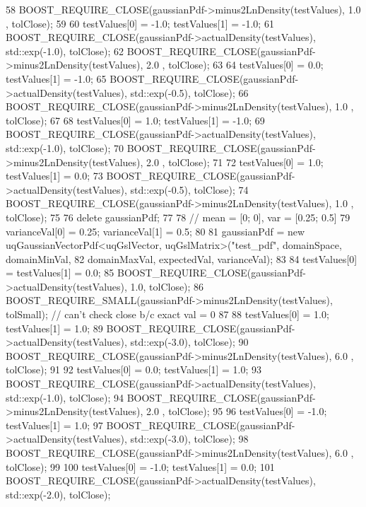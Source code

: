 \begin{DoxyCode}
58   BOOST\_REQUIRE\_CLOSE(gaussianPdf->minus2LnDensity(testValues),         1.0 , tolClose);
59 
60   testValues[0] = -1.0; testValues[1] = -1.0;
61   BOOST\_REQUIRE\_CLOSE(gaussianPdf->actualDensity(testValues), std::exp(-1.0), tolClose);
62   BOOST\_REQUIRE\_CLOSE(gaussianPdf->minus2LnDensity(testValues),         2.0 , tolClose);
63 
64   testValues[0] = 0.0; testValues[1] = -1.0;
65   BOOST\_REQUIRE\_CLOSE(gaussianPdf->actualDensity(testValues), std::exp(-0.5), tolClose);
66   BOOST\_REQUIRE\_CLOSE(gaussianPdf->minus2LnDensity(testValues),         1.0 , tolClose);
67 
68   testValues[0] = 1.0; testValues[1] = -1.0;
69   BOOST\_REQUIRE\_CLOSE(gaussianPdf->actualDensity(testValues), std::exp(-1.0), tolClose);
70   BOOST\_REQUIRE\_CLOSE(gaussianPdf->minus2LnDensity(testValues),         2.0 , tolClose);
71 
72   testValues[0] = 1.0; testValues[1] = 0.0;
73   BOOST\_REQUIRE\_CLOSE(gaussianPdf->actualDensity(testValues), std::exp(-0.5), tolClose);
74   BOOST\_REQUIRE\_CLOSE(gaussianPdf->minus2LnDensity(testValues),         1.0 , tolClose);
75 
76   \textcolor{keyword}{delete} gaussianPdf;
77 
78   \textcolor{comment}{// mean = [0; 0], var = [0.25; 0.5]}
79   varianceVal[0] = 0.25; varianceVal[1] = 0.5;
80 
81   gaussianPdf = \textcolor{keyword}{new} uqGaussianVectorPdf<uqGslVector, uqGslMatrix>(\textcolor{stringliteral}{"test\_pdf"}, domainSpace, domainMinVal, 
82                                                                                  domainMaxVal, expectedVal,
       varianceVal);
83   
84   testValues[0] = testValues[1] = 0.0;
85   BOOST\_REQUIRE\_CLOSE(gaussianPdf->actualDensity(testValues), 1.0, tolClose);
86   BOOST\_REQUIRE\_SMALL(gaussianPdf->minus2LnDensity(testValues),    tolSmall); \textcolor{comment}{// can't check close b/c
       exact val = 0}
87 
88   testValues[0] = 1.0; testValues[1] = 1.0;
89   BOOST\_REQUIRE\_CLOSE(gaussianPdf->actualDensity(testValues), std::exp(-3.0), tolClose);
90   BOOST\_REQUIRE\_CLOSE(gaussianPdf->minus2LnDensity(testValues),         6.0 , tolClose);
91 
92   testValues[0] = 0.0; testValues[1] = 1.0;
93   BOOST\_REQUIRE\_CLOSE(gaussianPdf->actualDensity(testValues), std::exp(-1.0), tolClose);
94   BOOST\_REQUIRE\_CLOSE(gaussianPdf->minus2LnDensity(testValues),         2.0 , tolClose);
95 
96   testValues[0] = -1.0; testValues[1] = 1.0;
97   BOOST\_REQUIRE\_CLOSE(gaussianPdf->actualDensity(testValues), std::exp(-3.0), tolClose);
98   BOOST\_REQUIRE\_CLOSE(gaussianPdf->minus2LnDensity(testValues),         6.0 , tolClose);
99 
100   testValues[0] = -1.0; testValues[1] = 0.0;
101   BOOST\_REQUIRE\_CLOSE(gaussianPdf->actualDensity(testValues), std::exp(-2.0), tolClose);

\end{DoxyCode}
